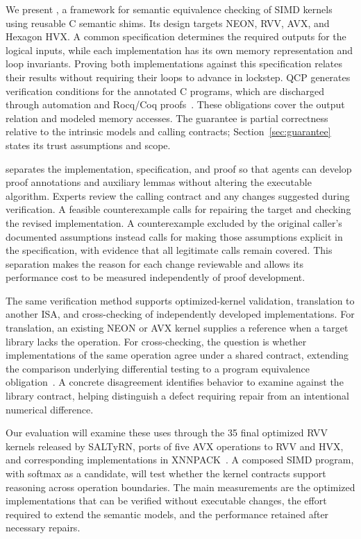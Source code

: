 We present \tool, a framework for semantic equivalence checking of SIMD kernels using reusable C semantic shims. Its design targets NEON, RVV, AVX, and Hexagon HVX.  A common specification determines the required outputs for the logical inputs, while each implementation has its own memory representation and loop invariants. Proving both implementations against this specification relates their results without requiring their loops to advance in lockstep. QCP generates verification conditions for the annotated C programs, which are discharged through automation and Rocq/Coq proofs~\cite{qcp}. These obligations cover the output relation and modeled memory accesses. The guarantee is partial correctness relative to the intrinsic models and calling contracts; Section~\ref{sec:guarantee} states its trust assumptions and scope.

\tool separates the implementation, specification, and proof so that agents can develop proof annotations and auxiliary lemmas without altering the executable algorithm. Experts review the calling contract and any changes suggested during verification. A feasible counterexample calls for repairing the target and checking the revised implementation. A counterexample excluded by the original caller's documented assumptions instead calls for making those assumptions explicit in the specification, with evidence that all legitimate calls remain covered. This separation makes the reason for each change reviewable and allows its performance cost to be measured independently of proof development.

The same verification method supports optimized-kernel validation, translation to another ISA, and cross-checking of independently developed implementations. For translation, an existing NEON or AVX kernel supplies a reference when a target library lacks the operation. For cross-checking, the question is whether implementations of the same operation agree under a shared contract, extending the comparison underlying differential testing to a program equivalence obligation~\cite{mckeeman,symdiff}. A concrete disagreement identifies behavior to examine against the library contract, helping distinguish a defect requiring repair from an intentional numerical difference.

Our evaluation will examine these uses through the 35 final optimized RVV kernels released by SALTyRN, ports of five AVX operations to RVV and HVX, and corresponding implementations in XNNPACK~\cite{final-kernels}. A composed SIMD program, with softmax as a candidate, will test whether the kernel contracts support reasoning across operation boundaries.  The main measurements are the optimized implementations that can be verified without executable changes, the effort required to extend the semantic models, and the performance retained after necessary repairs.

